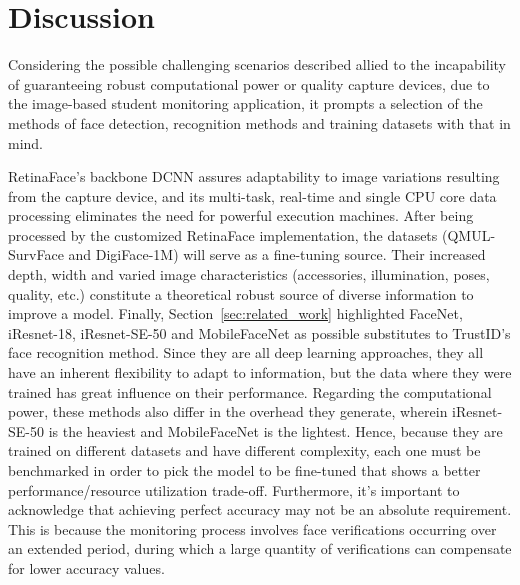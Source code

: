 \documentclass[class=report, crop=false, a4paper, 12pt]{standalone}
\begin{document}
\section{Discussion}\label{sec:methodology_discussion}
\par Considering the possible challenging scenarios described allied to the incapability of guaranteeing robust computational power or quality capture devices, due to the image-based student monitoring application, it prompts a selection of the methods of face detection, recognition methods and training datasets with that in mind. 
\par RetinaFace's backbone DCNN assures adaptability to image variations resulting from the capture device, and its multi-task, real-time and single CPU core data processing eliminates the need for powerful execution machines. After being processed by the customized RetinaFace implementation, the datasets (QMUL-SurvFace and DigiFace-1M) will serve as a fine-tuning source. Their increased depth, width and varied image characteristics (accessories, illumination, poses, quality, etc.) constitute a theoretical robust source of diverse information to improve a model. Finally, Section~\ref{sec:related_work} highlighted FaceNet, iResnet-18, iResnet-SE-50 and MobileFaceNet as possible substitutes to TrustID's face recognition method. Since they are all deep learning approaches, they all have an inherent flexibility to adapt to information, but the data where they were trained has great influence on their performance. Regarding the computational power, these methods also differ in the overhead they generate, wherein iResnet-SE-50 is the heaviest and MobileFaceNet is the lightest. Hence, because they are trained on different datasets and have different complexity, each one must be benchmarked in order to pick the model to be fine-tuned that shows a better performance/resource utilization trade-off. Furthermore, it's important to acknowledge that achieving perfect accuracy may not be an absolute requirement. This is because the monitoring process involves face verifications occurring over an extended period, during which a large quantity of verifications can compensate for lower accuracy values.
\end{document}
